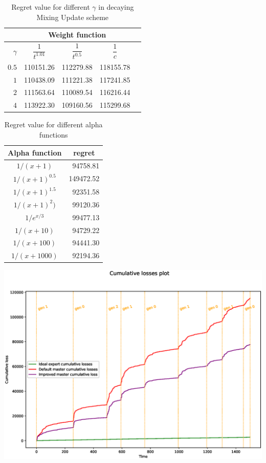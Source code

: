 \documentclass[12pt, twoside]{article}
\begin{document}
\begin{table}[h]
\centering
\begin{tabular}{r|cccc}
 &
\multicolumn{3}{c}{Weight function} \\
\toprule {$\gamma$}  &

\centering $\dfrac1{t^{1.01}}$  &
\centering $\dfrac1{t^{0.5}}$ &
\centering $\dfrac{1}{c}$  & \tabularnewline

\midrule
$0.5$ & 110151.26 & 112279.88 & 118155.78 \\
$1$ & 110438.09 & 111221.38 & 117241.85 \\
$2$ & 111563.64 & 110089.54 & 116216.44 \\
$4$ & 113922.30 & 109160.56 & 115299.68 \\
\bottomrule
\end{tabular}

\caption{Regret value for different $\gamma$ in decaying Mixing Update scheme}
\end{table}



\begin{table}[h]

\centering

\begin{tabular}{cc}
\toprule
Alpha function & regret \\
\midrule
$1 / (x + 1)$ &\ 94758.81 \\
$1 / (x + 1)^{0.5}$ & 149472.52 \\
$1 / (x + 1)^{1.5}$ &\ 92351.58 \\
$1 / (x + 1)^2)$ &\ 99120.36 \\
$1 / e^{x/3}$ &\ 99477.13 \\
$1 / (x + 10)$ &\ 94729.22 \\
$1 / (x + 100)$ &\ 94441.30 \\
$1 / (x + 1000)$ &\ 92194.36 \\
\bottomrule
\end{tabular}

\caption{Regret value for different alpha functions} \hspace{16cm}
\end{table}


\includegraphics[width=1\linewidth]{improvement3}
\end{document}
